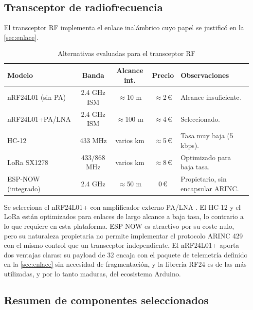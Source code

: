 \newpage
\subsection{Transceptor de radiofrecuencia}
\label{sec:sel_rf}

El transceptor RF implementa el enlace inalámbrico cuyo papel se justificó en la \cref{sec:enlace}.

\begin{table}[H]
    \centering
    \caption{Alternativas evaluadas para el transceptor RF}
    \label{tab:sel_rf}
    \footnotesize
    \begin{tabularx}{\linewidth}{l c c c X}
        \toprule
        \textbf{Modelo} & \textbf{Banda} & \textbf{Alcance int.} & \textbf{Precio} & \textbf{Observaciones} \\
        \midrule
        nRF24L01 (sin PA)   & 2.4 GHz ISM   & $\approx$10 m     & $\approx$2\,\euro{} & Alcance insuficiente. \\
        nRF24L01+PA/LNA     & 2.4 GHz ISM   & $\approx$100 m    & $\approx$4\,\euro{} & Seleccionado. \\
        HC-12               & 433 MHz       & varios km & $\approx$5\,\euro{} & Tasa muy baja (5 kbps). \\
        LoRa SX1278         & 433/868 MHz   & varios km & $\approx$8\,\euro{} & Optimizado para baja tasa. \\
        ESP-NOW (integrado) & 2.4 GHz       & $\approx$50 m     & 0\,\euro{}  & Propietario, sin encapsular ARINC. \\
        \bottomrule
    \end{tabularx}
\end{table}

Se selecciona el nRF24L01+ con amplificador externo PA/LNA
\cite{ds_nrf24l01p}. El HC-12 y el LoRa están optimizados para enlaces de
largo alcance a baja tasa, lo contrario a lo que requiere en esta plataforma.
ESP-NOW es atractivo por su coste nulo, pero su naturaleza propietaria no
permite implementar el protocolo ARINC 429 con el mismo control que un transceptor
independiente. El nRF24L01+ aporta dos ventajas claras: su payload de \SI{32}{\byte} encaja con
el paquete de telemetría definido en la \cref{sec:enlace} sin necesidad de
fragmentación, y la librería RF24 \cite{lib_rf24} es de las más utilizadas, y
por lo tanto maduras, del ecosistema Arduino.




\newpage
\subsection{Resumen de componentes seleccionados}
\label{sec:sel_resumen}

